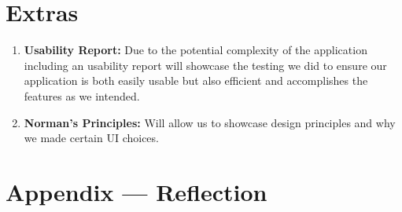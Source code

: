 \documentclass{article}
\begin{document}
\section{Extras}

\begin{enumerate}
    \item \textbf{Usability Report:} Due to the potential complexity of the application including an usability report will showcase the testing we did to ensure our application is both easily usable but also efficient and accomplishes the features as we intended.
    \item \textbf{Norman's Principles:} Will allow us to showcase design principles and why we made certain UI choices. 
\end{enumerate}

\newpage{}

\section*{Appendix --- Reflection}
\end{document}
